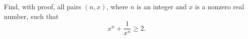 Find, with proof, all pairs $(n,x)$, where $n$ is an integer and $x$ is a nonzero real number, such that
\[x^n+\dfrac{1}{x^n}\ge2.\]
